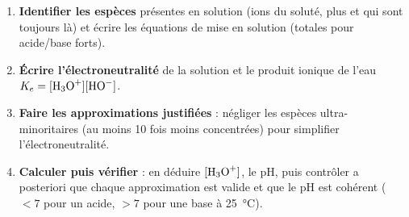\documentclass[11pt]{article}
\begin{document}
\begin{methode}
\begin{enumerate}
\item \textbf{Identifier les espèces} présentes en solution (ions du soluté, plus  et  qui sont toujours là) et écrire les équations de mise en solution (totales pour acide/base forts).
\item \textbf{Écrire l'électroneutralité} de la solution et le produit ionique de l'eau $K_e = [\ce{H3O+}][\ce{HO-}]$.
\item \textbf{Faire les approximations justifiées} : négliger les espèces ultra-minoritaires (au moins 10 fois moins concentrées) pour simplifier l'électroneutralité.
\item \textbf{Calculer puis vérifier} : en déduire $[\ce{H3O+}]$, le pH, puis contrôler a posteriori que chaque approximation est valide et que le pH est cohérent ($< 7$ pour un acide, $> 7$ pour une base à \SI{25}{\celsius}).
\end{enumerate}
\end{methode}
\end{document}
